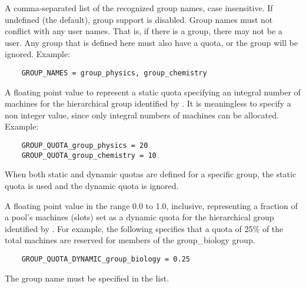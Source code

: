 \begin{description}

\label{param:GroupNames}
\item[\Macro{GROUP\_NAMES}]
  A comma-separated list of the recognized group names, case insensitive.
  If undefined (the default), group support is disabled.
  Group names must not conflict with any user names.
  That is, if there is a \verb@physics@ group, there may not be
  a \verb@physics@ user.
  Any group that is defined here must also have a quota,
  or the group will be ignored. Example: 
  \begin{verbatim}
    GROUP_NAMES = group_physics, group_chemistry 
  \end{verbatim}

\label{param:GroupQuotaGroupname}
\item[\Macro{GROUP\_QUOTA\_<groupname>}]
  A floating point value to represent a static quota specifying
  an integral number of machines for the hierarchical group
  identified by .
  It is meaningless to specify a non integer value, 
  since only integral numbers of machines can be allocated.
  Example:
  \begin{verbatim}
    GROUP_QUOTA_group_physics = 20
    GROUP_QUOTA_group_chemistry = 10
  \end{verbatim}
  When both static and dynamic quotas are defined for a specific group,
  the static quota is used and the dynamic quota is ignored. 

\label{param:GroupQuotaDynamicGroupname}
\item[\Macro{GROUP\_QUOTA\_DYNAMIC\_<groupname>}]
  A floating point value in the range 0.0 to 1.0, inclusive,
  representing a fraction of a pool's machines (slots) set as
  a dynamic quota for the hierarchical group identified by .
  For example, the following
  specifies that a quota of 25\% of the total machines are
  reserved for members of the group\_biology group.
  \begin{verbatim}
  	GROUP_QUOTA_DYNAMIC_group_biology = 0.25
  \end{verbatim}
  The group name must be specified in the  list.
  \MoreTodo


\end{description}
